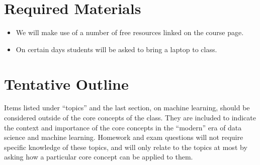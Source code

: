 \documentclass[11pt]{article}
\begin{document}
\bigskip


\section*{Required Materials}

\begin{itemize}
\item We will make use of a number of free resources linked on the course page.
\item On certain days students will be asked to bring a laptop to class. 
\end{itemize}



\section*{Tentative Outline}

Items listed under ``topics'' and the last section, on machine learning, should be considered outside of the core concepts of the class. They are included to indicate the context and importance of the core concepts in the ``modern'' era of data science and machine learning. Homework and exam questions will not require specific knowledge of these topics, and will only relate to the topics at most by asking how a particular core concept can be applied to them.
\end{document}

